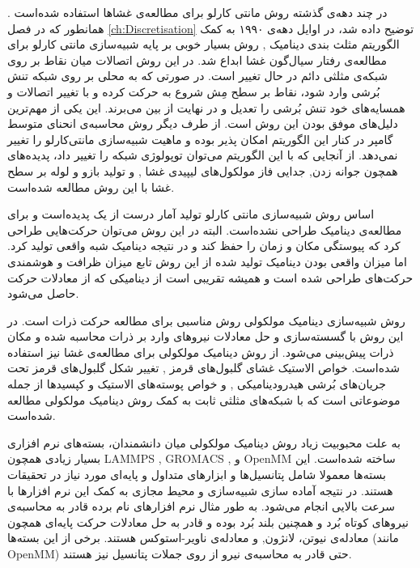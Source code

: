 در چند دهه‌ی گذشته روش‌ مانتی‌ کارلو برای مطالعه‌ی غشا‌ها استفاده شده‌است
\cite{Canham1970, Evans1974, schneider1984, Nelson1987PRA, NelsonPRL1987, Gompper1991, Gompper1992Science, Lim2002PNAS, Gompper2005PRE}.
 همانطور که در فصل 
\ref{ch:Discretisation}
توضیح داده شد، در اوایل دهه‌ی ۱۹۹۰ به کمک الگوریتم مثلث بندی دینامیک
\cite{Boal1992PRA, Gompper1992Science},
 روش‌ بسیار خوبی بر پایه شبیه‌سازی مانتی کارلو برای مطالعه‌ی رفتار سیال‌گون غشا ابداع شد. در این روش اتصالات میان نقاط بر روی شبکه‌ی مثلثی دائم در حال تغییر است. در صورتی که به محلی بر روی شبکه تنش بُرشی وارد شود، نقاط بر سطح مِش شروع به حرکت کرده و با تغییر اتصالات و همسایه‌های خود تنش بُرشی را تعدیل و در نهایت از بین می‌برند. این یکی از مهم‌ترین دلیل‌های موفق بودن این روش است. از طرف دیگر روش محاسبه‌ی انحنای متوسط گامپر
\cite{Gompper1992Science}
در کنار این الگوریتم امکان پذیر بوده و ماهیت شبیه‌سازی مانتی‌کارلو را تغییر نمی‌دهد. از آنجایی که با این الگوریتم می‌توان توپولوژی شبکه را تغییر داد، پدیده‌های همچون جوانه زدن,
 جدایی فاز مولکول‌های لیپیدی غشا
\cite{Kohyama2003PRE, Gompper2007PRL, Laradji2004PRL},
 و تولید بازو‌ و لوله‌
بر سطح غشا
\cite{Ramakrishnan2013BiophysJ}
با این روش مطالعه شده‌است. 

اساس روش شبیه‌سازی مانتی کارلو تولید آمار درست از یک پدیده‌است و برای مطالعه‌ی دینامیک طراحی نشده‌است. البته در این روش می‌توان حرکت‌هایی طراحی کرد که پیوستگی مکان و زمان را حفظ کند و در نتیجه دینامیک شبه  واقعی تولید کرد. اما میزان واقعی بودن دینامیک تولید شده از این روش تابع میزان ظرافت و هوشمندی  حرکت‌های طراحی شده است و همیشه تقریبی است از دینامیکی که از معادلات حرکت حاصل می‌شود.

روش شبیه‌سازی دینامیک مولکولی روش مناسبی برای مطالعه حرکت ذرات است. در این روش با گسسته‌سازی و حل معادلات نیرو‌های وارد بر ذرات محاسبه شده و  مکان ذرات پیش‌بینی  می‌شود. از روش دینامیک مولکولی برای مطالعه‌ی غشا نیز استفاده شده‌است. خواص الاستیک غشای گلبول‌های قرمز
\cite{Hale2009SoftMatter, Geekiyanage2019PLOS},
 تغییر شکل گلبول‌های قرمز تحت جریان‌های بُرشی هیدرودینامیکی
\cite{Noguchi2005PNAS},
 و  خواص پوسته‌های الاستیک و کپسید‌ها
\cite{NelsonPRL1987, gomppernelson2012}
از جمله موضوعاتی است که با شبکه‌های مثلثی ثابت به کمک روش دینامیک مولکولی مطالعه شده‌است.

به علت محبوبیت زیاد روش دینامیک مولکولی میان دانشمندان، بسته‌های نرم‌ افزار‌ی بسیار زیادی همچون 
LAMMPS \cite{LAMMPS}, GROMACS \cite{GROMACS},
 و
OpenMM \cite{OpenMM2017}
ساخته‌ شده‌است.  این بسته‌ها معمولا شامل پتانسیل‌ها و ابزار‌های متداول و پایه‌ای مورد نیاز در تحقیقات هستند. در نتیجه آماده سازی شبیه‌سازی و محیط مجازی به کمک این نرم افزار‌ها با سرعت بالایی انجام می‌شود. به طور مثال نرم افزار‌های نام برده قادر به محاسبه‌ی نیروهای کوتاه بُرد و همچنین بلند بُرد بوده و قادر به حل معادلات حرکت پایه‌ای همچون معادله‌ی نیوتن، لانژون,
 و معادله‌ی ناویر-استوکس
هستند. برخی از این بسته‌ها (مانند 
OpenMM)
 حتی قادر به محاسبه‌ی نیرو از روی جملات پتانسیل نیز هستند. 


